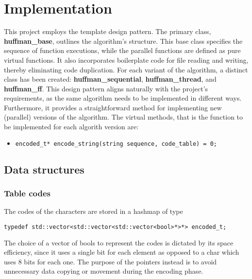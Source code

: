 \documentclass{article}
\begin{document}
\section{Implementation}
This project employs the template design pattern. The primary class, \textbf{huffman\_base}, outlines the algorithm's structure.
This base class specifies the sequence of function executions, while the parallel functions are defined as pure virtual functions.
It also incorporates boilerplate code for file reading and writing, thereby eliminating code duplication.
For each variant of the algorithm, a distinct class has been created: \textbf{huffman\_sequential}, \textbf{huffman\_thread}, and \textbf{huffman\_ff}.
This design pattern aligns naturally with the project's requirements, as the same algorithm needs to be implemented in different ways.
Furthermore, it provides a straightforward method for implementing new (parallel) versions of the algorithm.
The virtual methods, that is the function to be implemented for each algorith version are:
\begin{itemize}
\item \begin{verbatim}
encoded_t* encode_string(string sequence, code_table) = 0;
\end{verbatim}

\end{itemize}

\subsection{Data structures}
\subsubsection{Table codes}
The codes of the characters are stored in a hashmap of type
\begin{verbatim}
typedef std::vector<std::vector<std::vector<bool>*>*> encoded_t;
\end{verbatim}
The choice of a vector of bools to represent the codes is dictated by its space efficiency, since it uses a single bit for each element
as opposed to a char which uses 8 bits for each one.
The purpose of the pointers instead is to avoid unnecessary data copying or movement during the encoding phase.
\end{document}
